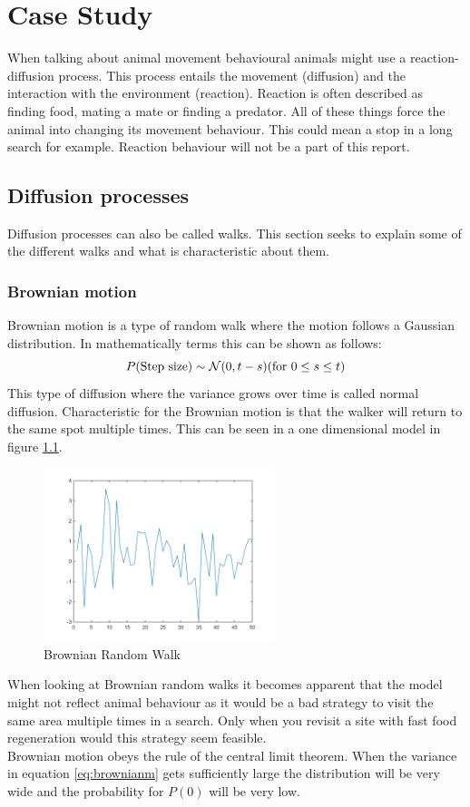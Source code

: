 \chapter{Case Study}
When talking about animal movement behavioural animals might use a reaction-diffusion process. This process entails the movement (diffusion) and the interaction with the environment (reaction). Reaction is often described as finding food, mating a mate or finding a predator. All of these things force the animal into changing its movement behaviour. This could mean a stop in a long search for example. Reaction behaviour will not be a part of this report.

\section{Diffusion processes}
Diffusion processes can also be called walks. This section seeks to explain some of the different walks and what is characteristic about them.

\subsection{Brownian motion}
Brownian motion is a type of random walk where the motion follows a Gaussian distribution. In mathematically terms this can be shown as follows:
\begin{equation}
P($Step size$) \sim \mathcal{N}(0,t-s) ($for $ 0 \leq s \leq t)
\label{eq:brownianm}
\end{equation}
This type of diffusion where the variance grows over time is called normal diffusion. Characteristic for the Brownian motion is that the walker will return to the same spot multiple times. This can be seen in a one dimensional model in figure \ref{fig:brownianrw}.
\begin{figure}[H]
\centering
\includegraphics[width = 0.6\textwidth]{billeder/brownian}
\caption{Brownian Random Walk}
\label{fig:brownianrw}
\end{figure}
When looking at Brownian random walks it becomes apparent that the model might not reflect animal behaviour as it would be a bad strategy to visit the same area multiple times in a search. Only when you revisit a site with fast food regeneration would this strategy seem feasible.\\
Brownian motion obeys the rule of the central limit theorem. When the variance in equation \ref{eq:brownianm} gets sufficiently large the distribution will be very wide and the probability for $P(0)$ will be very low.

